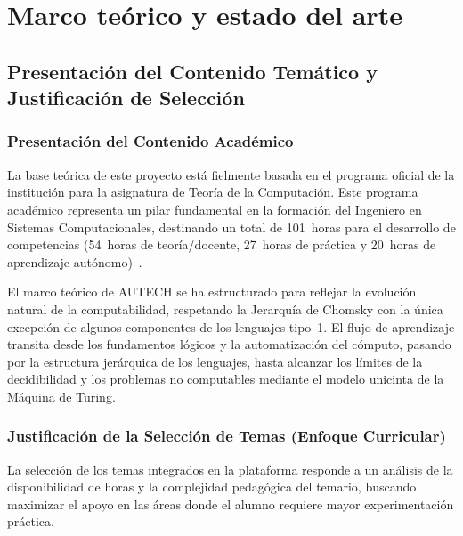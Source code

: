 
\chapter{Marco teórico y estado del arte}
\label{ch:cap2}

\section{Presentación del Contenido Temático y Justificación de Selección}
\label{sec:contenido_tematico}

\subsection{Presentación del Contenido Académico}
\label{ssec:contenido_academico}

La base teórica de este proyecto está fielmente basada en el programa oficial de la institución
para la asignatura de Teoría de la Computación. Este programa académico representa un pilar
fundamental en la formación del Ingeniero en Sistemas Computacionales, destinando un total de
101~horas para el desarrollo de competencias (54~horas de teoría/docente, 27~horas de práctica
y 20~horas de aprendizaje autónomo)~\cite{ipn2020}.

El marco teórico de AUTECH se ha estructurado para reflejar la evolución natural de la
computabilidad, respetando la Jerarquía de Chomsky con la única excepción de algunos
componentes de los lenguajes tipo~1. El flujo de aprendizaje transita desde los fundamentos
lógicos y la automatización del cómputo, pasando por la estructura jerárquica de los lenguajes,
hasta alcanzar los límites de la decidibilidad y los problemas no computables mediante el
modelo unicinta de la Máquina de Turing.

\subsection{Justificación de la Selección de Temas (Enfoque Curricular)}
\label{ssec:seleccion_temas}

La selección de los temas integrados en la plataforma responde a un análisis de la
disponibilidad de horas y la complejidad pedagógica del temario, buscando maximizar el apoyo
en las áreas donde el alumno requiere mayor experimentación práctica.

